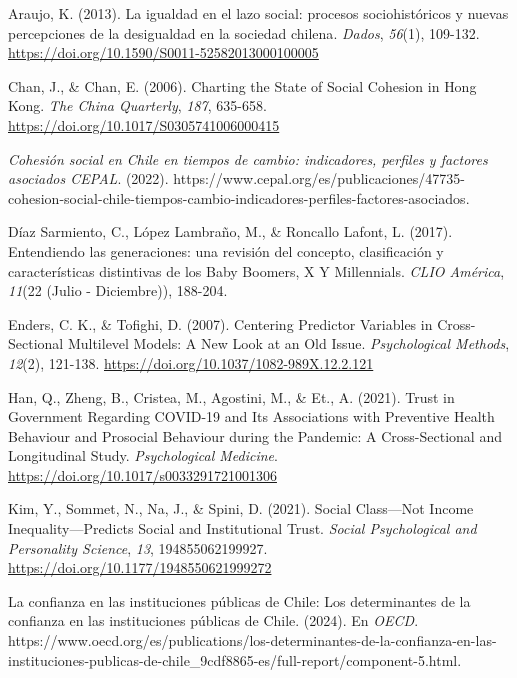 \documentclass[
  spanish,
  a4paper,
  oneside]{scrbook}
\newlength{\cslhangindent}
\newenvironment{CSLReferences}[2] %
 {\begin{list}{}{%
  \setlength{\itemindent}{0pt}
  \setlength{\leftmargin}{0pt}
  \setlength{\parsep}{0pt}
  \ifodd #1
   \setlength{\leftmargin}{\cslhangindent}
   \setlength{\itemindent}{-1\cslhangindent}
  \fi
  \setlength{\itemsep}{#2\baselineskip}}}
 {\end{list}}
\begin{document}
\protect{}\label{refs}
\begin{CSLReferences}{1}{0}
Araujo, K. (2013). {La igualdad en el lazo social: procesos
sociohistóricos y nuevas percepciones de la desigualdad en la sociedad
chilena}. \emph{Dados}, \emph{56}(1), 109-132.
\url{https://doi.org/10.1590/S0011-52582013000100005}

Chan, J., \& Chan, E. (2006). Charting the {State} of {Social Cohesion}
in {Hong Kong}. \emph{The China Quarterly}, \emph{187}, 635-658.
\url{https://doi.org/10.1017/S0305741006000415}

\emph{{Cohesión social en Chile en tiempos de cambio: indicadores,
perfiles y factores asociados \textbar{} CEPAL}}. (2022).
https://www.cepal.org/es/publicaciones/47735-cohesion-social-chile-tiempos-cambio-indicadores-perfiles-factores-asociados.

Díaz Sarmiento, C., López Lambraño, M., \& Roncallo Lafont, L. (2017).
{Entendiendo las generaciones: una revisión del concepto, clasificación
y características distintivas de los Baby Boomers, X Y Millennials}.
\emph{CLIO América}, \emph{11}(22 (Julio - Diciembre)), 188-204.

Enders, C. K., \& Tofighi, D. (2007). Centering Predictor Variables in
Cross-Sectional Multilevel Models: {A} New Look at an Old Issue.
\emph{Psychological Methods}, \emph{12}(2), 121-138.
\url{https://doi.org/10.1037/1082-989X.12.2.121}

Han, Q., Zheng, B., Cristea, M., Agostini, M., \& Et., A. (2021). Trust
in Government Regarding {COVID-19} and Its Associations with Preventive
Health Behaviour and Prosocial Behaviour during the Pandemic: A
Cross-Sectional and Longitudinal Study. \emph{Psychological Medicine}.
\url{https://doi.org/10.1017/s0033291721001306}

Kim, Y., Sommet, N., Na, J., \& Spini, D. (2021). Social {Class}---{Not
Income Inequality}---{Predicts Social} and {Institutional Trust}.
\emph{Social Psychological and Personality Science}, \emph{13},
194855062199927. \url{https://doi.org/10.1177/1948550621999272}

{La confianza en las instituciones públicas de Chile: Los determinantes
de la confianza en las instituciones públicas de Chile}. (2024). En
\emph{OECD}.
https://www.oecd.org/es/publications/los-determinantes-de-la-confianza-en-las-instituciones-publicas-de-chile\_9cdf8865-es/full-report/component-5.html.


\end{CSLReferences}
\end{document}
